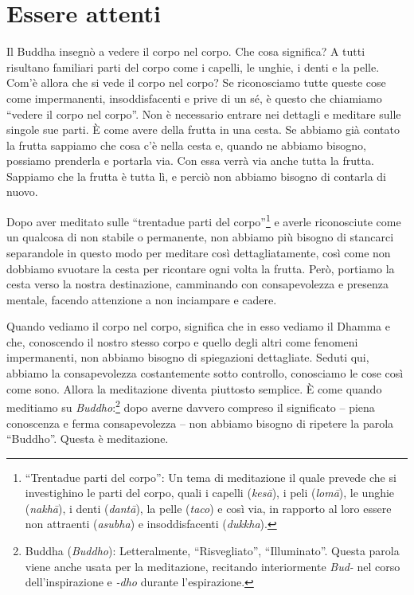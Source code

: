\chapter{Essere attenti}

Il Buddha insegnò a vedere il corpo nel corpo. Che cosa significa? A
tutti risultano familiari parti del corpo come i capelli, le unghie, i
denti e la pelle. Com'è allora che si vede il corpo nel corpo? Se
riconosciamo tutte queste cose come impermanenti, insoddisfacenti e
prive di un sé, è questo che chiamiamo ``vedere il corpo nel corpo''.
Non è necessario entrare nei dettagli e meditare sulle singole sue
parti. È come avere della frutta in una cesta. Se abbiamo già contato la
frutta sappiamo che cosa c'è nella cesta e, quando ne abbiamo bisogno,
possiamo prenderla e portarla via. Con essa verrà via anche tutta la
frutta. Sappiamo che la frutta è tutta lì, e perciò non abbiamo bisogno
di contarla di nuovo.

Dopo aver meditato sulle ``trentadue parti del corpo''\footnote{%
  ``Trentadue parti del corpo'': Un tema di meditazione il quale prevede che si
  investighino le parti del corpo, quali i capelli (\emph{kesā}), i peli
  (\emph{lomā}), le unghie (\emph{nakhā}), i denti (\emph{dantā}), la
  pelle (\emph{taco}) e così via, in rapporto al loro essere non
  attraenti (\emph{asubha}) e insoddisfacenti (\emph{dukkha}).}
e averle riconosciute come un qualcosa di non stabile o permanente, non abbiamo
più bisogno di stancarci separandole in questo modo per meditare così
dettagliatamente, così come non dobbiamo svuotare la cesta per ricontare
ogni volta la frutta. Però, portiamo la cesta verso la nostra
destinazione, camminando con consapevolezza e presenza mentale, facendo
attenzione a non inciampare e cadere.

Quando vediamo il corpo nel corpo, significa che in esso vediamo il
Dhamma e che, conoscendo il nostro stesso corpo e quello degli altri
come fenomeni impermanenti, non abbiamo bisogno di spiegazioni
dettagliate. Seduti qui, abbiamo la consapevolezza costantemente sotto
controllo, conosciamo le cose così come sono. Allora la meditazione
diventa piuttosto semplice. È come quando meditiamo su
\emph{Buddho}:\footnote{Buddha (\emph{Buddho}): Letteralmente,
  ``Risvegliato'', ``Illuminato''. Questa parola viene anche usata per
  la meditazione, recitando interiormente \emph{Bud-} nel corso
  dell'inspirazione e \emph{-dho} durante l'espirazione.} dopo averne
davvero compreso il significato -- piena conoscenza e ferma
consapevolezza -- non abbiamo bisogno di ripetere la parola ``Buddho''.
Questa è meditazione.

